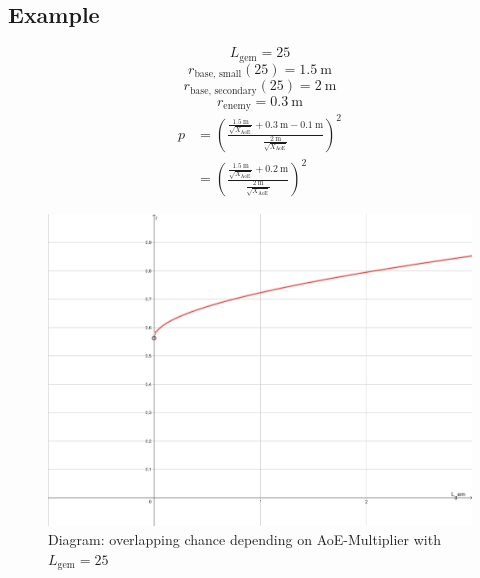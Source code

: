 \subsection{Example}
\begin{equation}
	L_\text{gem} = 25
\end{equation}
\begin{equation}
	r_\text{base, small}(25) = \SI{1.5}{\meter}
\end{equation}
\begin{equation}
	r_\text{base, secondary}(25) = \SI{2}{\meter}
\end{equation}
\begin{equation}
	r_\text{enemy} = \SI{0.3}{\meter}
\end{equation}
\begin{align}
	p &= \left(\frac{\frac{\SI{1.5}{\meter}}{\sqrt{X_\text{AoE}}} + \SI{0.3}{\meter} - \SI{0.1}{\meter}}{\frac{\SI{2}{\meter}}{\sqrt{X_\text{AoE}}}}\right)^2\\
	&= \left(\frac{\frac{\SI{1.5}{\meter}}{\sqrt{X_\text{AoE}}} + \SI{0.2}{\meter}}{\frac{\SI{2}{\meter}}{\sqrt{X_\text{AoE}}}}\right)^2
\end{align}

\begin{figure}
	\centering
	\includegraphics[width=\linewidth]{./02_Illustrations/Diagram_IncAoEToOverlappingChance_GLvL25.png}
	\caption{Diagram: overlapping chance depending on AoE-Multiplier with $L_\text{gem} = 25$}
	\label{fig:Diagram_IncAoEToOverlappingChance_GLvL25}
\end{figure}
